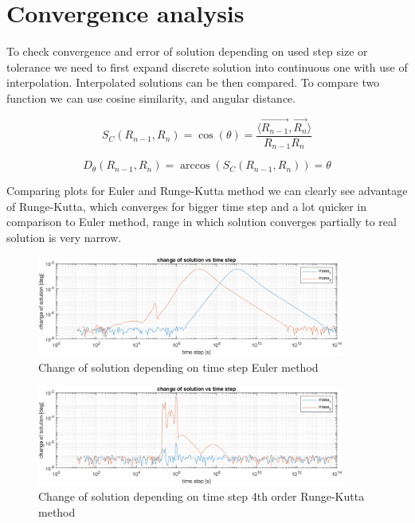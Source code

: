 \documentclass[english,12pt,a4paper, notitlepage]{report}
\begin{document}
		
	\newpage
	\section{Convergence analysis}
	
	To check convergence and error of solution depending on used step size or tolerance we need to first expand discrete solution into continuous one with use of interpolation.
	Interpolated solutions can be then compared. To compare two function we can use cosine similarity, and angular distance.
	
	\begin{equation}
		S_C(R_{n-1}, R_{n}) = \cos(\theta) = \dfrac{\langle \vec{R_{n-1}}, \vec{R_{n}} \rangle}{R_{n-1} R_{n}}
	\end{equation}
	
	\begin{equation}
		D_\theta (R_{n-1}, R_{n}) = \arccos(S_C(R_{n-1}, R_{n})) = \theta
	\end{equation}
	
	Comparing plots for Euler and Runge-Kutta method we can clearly see advantage of Runge-Kutta, which converges for bigger time step and a lot quicker in comparison to Euler method, range in which solution converges partially to real solution is very narrow. 
	
		\begin{figure}[h!]
			\centering
			\includegraphics[width = 0.9\textwidth]{euler_err.png}
			\caption{Change of solution depending on time step Euler method}
		\end{figure}
		
		\begin{figure}[h!]
			\centering
			\includegraphics[width = 0.9\textwidth]{RK4_err.png}
			\caption{Change of solution depending on time step 4th order Runge-Kutta method}
		\end{figure}
		
\end{document}
